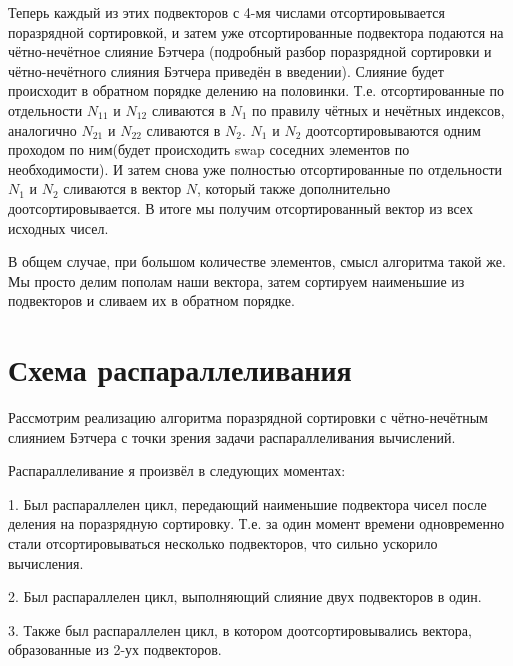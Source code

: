 \documentclass{report}
\begin{document}
\par Теперь каждый из этих подвекторов с 4-мя числами отсортировывается поразрядной сортировкой, и затем уже отсортированные подвектора подаются на чётно-нечётное слияние Бэтчера (подробный разбор поразрядной сортировки и чётно-нечётного слияния Бэтчера приведён в введении). Слияние будет происходит в обратном порядке делению на половинки. Т.е. отсортированные по отдельности $N_{11}$ и $N_{12}$ сливаются в $N_1$ по правилу чётных и нечётных индексов, аналогично $N_{21}$ и $N_{22}$ сливаются в $N_2$. $N_1$ и $N_2$ доотсортировываются одним проходом по ним(будет происходить swap соседних элементов по необходимости). И затем снова уже полностью отсортированные по отдельности $N_1$ и $N_2$ сливаются в вектор $N$, который также дополнительно доотсортировывается. В итоге мы получим отсортированный вектор из всех исходных чисел.

\par В общем случае, при большом количестве элементов, смысл алгоритма такой же. Мы просто делим пополам наши вектора, затем сортируем наименьшие из подвекторов и сливаем их в обратном порядке.

\newpage

\section*{Схема распараллеливания}
Рассмотрим реализацию алгоритма поразрядной сортировки с чётно-нечётным слиянием Бэтчера с точки зрения задачи распараллеливания вычислений.

\par Распараллеливание я произвёл в следующих моментах:

\par 1. Был распараллелен цикл, передающий наименьшие подвектора чисел после деления на поразрядную сортировку. Т.е. за один момент времени одновременно стали отсортировываться несколько подвекторов, что сильно ускорило вычисления.
\par 2. Был распараллелен цикл, выполняющий слияние двух подвекторов в один.
\par 3. Также был распараллелен цикл, в котором доотсортировывались вектора, образованные из 2-ух подвекторов.

\newpage

\end{document}
